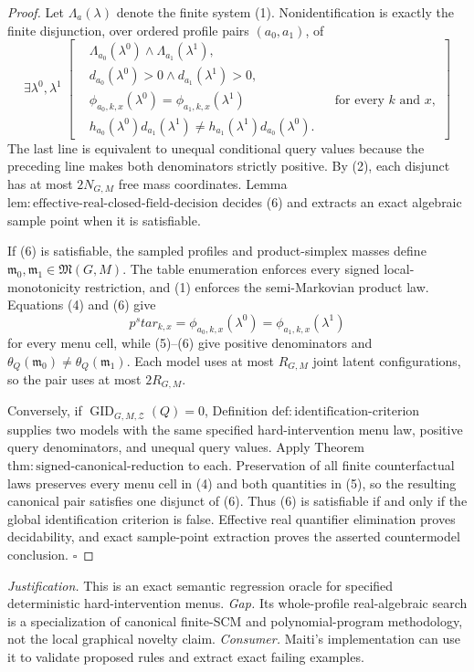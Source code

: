 \documentclass{article}
\begin{document}
\begin{proof}
Let \(\Lambda_a(\lambda)\) denote the finite system (1).  Nonidentification is exactly the finite disjunction, over ordered profile pairs \((a_0,a_1)\), of
\[
 \exists\lambda^0,\lambda^1\;\left[
 \begin{aligned}
 &\Lambda_{a_0}(\lambda^0)\wedge\Lambda_{a_1}(\lambda^1),\\
 &d_{a_0}(\lambda^0)>0\wedge d_{a_1}(\lambda^1)>0,\\
 &\phi_{a_0,k,x}(\lambda^0)=\phi_{a_1,k,x}(\lambda^1)
       &&\text{for every \(k\) and \(x\)},\\
 &h_{a_0}(\lambda^0)d_{a_1}(\lambda^1)
   \ne h_{a_1}(\lambda^1)d_{a_0}(\lambda^0).
 \end{aligned}\right]
\tag{6}
\]
The last line is equivalent to unequal conditional query values because the preceding line makes both denominators strictly positive.  By (2), each disjunct has at most \(2N_{G,M}\) free mass coordinates.  Lemma \(\mathrm{lem:effective\text{-}real\text{-}closed\text{-}field\text{-}decision}\) decides (6) and extracts an exact algebraic sample point when it is satisfiable.

If (6) is satisfiable, the sampled profiles and product-simplex masses define \(\mathfrak m_0,\mathfrak m_1\in\mathfrak M(G,M)\).  The table enumeration enforces every signed local-monotonicity restriction, and (1) enforces the semi-Markovian product law.  Equations (4) and (6) give
\[
 p^star_{k,x}
 =\phi_{a_0,k,x}(\lambda^0)
 =\phi_{a_1,k,x}(\lambda^1)
\]
for every menu cell, while (5)--(6) give positive denominators and
\(
 \theta_Q(\mathfrak m_0)\ne\theta_Q(\mathfrak m_1)
\).
Each model uses at most \(R_{G,M}\) joint latent configurations, so the pair uses at most \(2R_{G,M}\).

Conversely, if \(\operatorname{GID}_{G,M,\mathcal Z}(Q)=0\), Definition \(\mathrm{def:identification\text{-}criterion}\) supplies two models with the same specified hard-intervention menu law, positive query denominators, and unequal query values.  Apply Theorem \(\mathrm{thm:signed\text{-}canonical\text{-}reduction}\) to each.  Preservation of all finite counterfactual laws preserves every menu cell in (4) and both quantities in (5), so the resulting canonical pair satisfies one disjunct of (6).  Thus (6) is satisfiable if and only if the global identification criterion is false.  Effective real quantifier elimination proves decidability, and exact sample-point extraction proves the asserted countermodel conclusion. \(\square\)
\end{proof}
\par\smallskip\noindent \textit{Justification.} This is an exact semantic regression oracle for specified deterministic hard-intervention menus. \textit{Gap.} Its whole-profile real-algebraic search is a specialization of canonical finite-SCM and polynomial-program methodology, not the local graphical novelty claim. \textit{Consumer.} Maiti's implementation can use it to validate proposed rules and extract exact failing examples.
\end{document}
